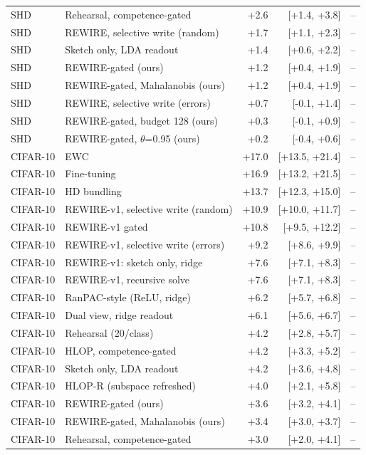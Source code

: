 \begin{tabular}{llrrr}
SHD & Rehearsal, competence-gated & +2.6 & [+1.4, +3.8] & -- \\
SHD & REWIRE, selective write (random) & +1.7 & [+1.1, +2.3] & -- \\
SHD & Sketch only, LDA readout & +1.4 & [+0.6, +2.2] & -- \\
SHD & REWIRE-gated (ours) & +1.2 & [+0.4, +1.9] & -- \\
SHD & REWIRE-gated, Mahalanobis (ours) & +1.2 & [+0.4, +1.9] & -- \\
SHD & REWIRE, selective write (errors) & +0.7 & [-0.1, +1.4] & -- \\
SHD & REWIRE-gated, budget 128 (ours) & +0.3 & [-0.1, +0.9] & -- \\
SHD & REWIRE-gated, $\theta$=0.95 (ours) & +0.2 & [-0.4, +0.6] & -- \\
CIFAR-10 & EWC & +17.0 & [+13.5, +21.4] & -- \\
CIFAR-10 & Fine-tuning & +16.9 & [+13.2, +21.5] & -- \\
CIFAR-10 & HD bundling & +13.7 & [+12.3, +15.0] & -- \\
CIFAR-10 & REWIRE-v1, selective write (random) & +10.9 & [+10.0, +11.7] & -- \\
CIFAR-10 & REWIRE-v1 gated & +10.8 & [+9.5, +12.2] & -- \\
CIFAR-10 & REWIRE-v1, selective write (errors) & +9.2 & [+8.6, +9.9] & -- \\
CIFAR-10 & REWIRE-v1: sketch only, ridge & +7.6 & [+7.1, +8.3] & -- \\
CIFAR-10 & REWIRE-v1, recursive solve & +7.6 & [+7.1, +8.3] & -- \\
CIFAR-10 & RanPAC-style (ReLU, ridge) & +6.2 & [+5.7, +6.8] & -- \\
CIFAR-10 & Dual view, ridge readout & +6.1 & [+5.6, +6.7] & -- \\
CIFAR-10 & Rehearsal (20/class) & +4.2 & [+2.8, +5.7] & -- \\
CIFAR-10 & HLOP, competence-gated & +4.2 & [+3.3, +5.2] & -- \\
CIFAR-10 & Sketch only, LDA readout & +4.2 & [+3.6, +4.8] & -- \\
CIFAR-10 & HLOP-R (subspace refreshed) & +4.0 & [+2.1, +5.8] & -- \\
CIFAR-10 & REWIRE-gated (ours) & +3.6 & [+3.2, +4.1] & -- \\
CIFAR-10 & REWIRE-gated, Mahalanobis (ours) & +3.4 & [+3.0, +3.7] & -- \\
CIFAR-10 & Rehearsal, competence-gated & +3.0 & [+2.0, +4.1] & -- \\

\end{tabular}
